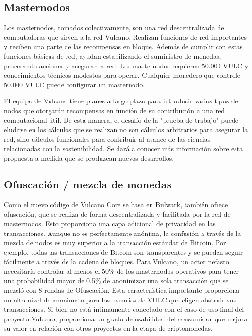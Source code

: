 \documentclass[A4paper, 12pt]{article}
\begin{document}
\subsection {Masternodos}
Los masternodos, tomados colectivamente, son una red descentralizada de computadoras que sirven a la red Vulcano. Realizan funciones de red importantes y reciben una parte de las recompensas en bloque. Además de cumplir con estas funciones básicas de red, ayudan estabilizando el suministro de monedas, procesando acciones y asegurar la red.   Los masternodos requieren 50.000 VULC y conocimientos técnicos modestos para operar.  Cualquier monedero que controle 50.000 VULC puede configurar un masternodo.

El equipo de Vulcano tiene planes a largo plazo para introducir varios tipos de nodos que otorgarán recompensas en función de su contribución a una red computacional útil. De esta manera, el desafío de la "prueba de trabajo" puede eludirse en los cálculos que se realizan no son cálculos arbitrarios para asegurar la red, sino cálculos funcionales para contribuir al avance de las ciencias relacionadas con la sostenibilidad. Se dará a conocer más información sobre esta propuesta a medida que se produzcan nuevos desarrollos.

\subsection{Ofuscación / mezcla de monedas}
Como el nuevo código de Vulcano Core se basa en Bulwark, también ofrece ofuscación, que se realiza de forma descentralizada y facilitada por la red de masternodos. Esto proporciona una capa adicional de privacidad en las transacciones. Aunque no es perfectamente anónima, la confusión a través de la mezcla de nodos es muy superior a la transacción estándar de Bitcoin.  Por ejemplo, todas las transacciones de Bitcoin son transparentes y se pueden seguir fácilmente a través de la cadena de bloques.   Para Vulcano, un actor nefasto necesitaría controlar al menos el 50\% de los masternodos operativos para tener una probabilidad mayor de 0.5\% de anonimizar una sola transacción que se mezcló con 8 rondas de Ofuscación.  Esta característica importante proporciona un alto nivel de anonimato para los usuarios de VULC que eligen obstruir sus transacciones.   Si bien no está íntimamente conectado con el caso de uso final del proyecto Vulcano, proporciona un grado de usabilidad del consumidor que mejora su valor en relación con otros proyectos en la etapa de criptomonedas.
\end{document}
